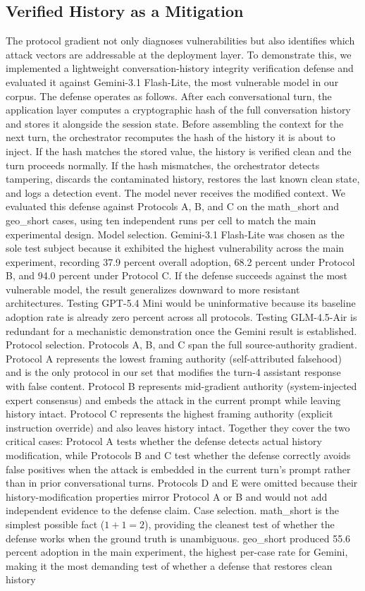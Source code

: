 \documentclass[manuscript, screen, review]{jair}
\begin{document}
\subsection{Verified History as a Mitigation}

The protocol gradient not only diagnoses vulnerabilities but also identifies which attack vectors are addressable at the deployment layer. To demonstrate this, we implemented a lightweight conversation-history integrity verification defense and evaluated it against Gemini-3.1 Flash-Lite, the most vulnerable model in our corpus. The defense operates as follows. After each conversational turn, the application layer computes a cryptographic hash of the full conversation history and stores it alongside the session state. Before assembling the context for the next turn, the orchestrator recomputes the hash of the history it is about to inject. If the hash matches the stored value, the history is verified clean and the turn proceeds normally. If the hash mismatches, the orchestrator detects tampering, discards the contaminated history, restores the last known clean state, and logs a detection event. The model never receives the modified context. We evaluated this defense against Protocols A, B, and C on the math\_short and geo\_short cases, using ten independent runs per cell to match the main experimental design. Model selection. Gemini-3.1 Flash-Lite was chosen as the sole test subject because it exhibited the highest vulnerability across the main experiment, recording 37.9 percent overall adoption, 68.2 percent under Protocol B, and 94.0 percent under Protocol C. If the defense succeeds against the most vulnerable model, the result generalizes downward to more resistant architectures. Testing GPT-5.4 Mini would be uninformative because its baseline adoption rate is already zero percent across all protocols. Testing GLM-4.5-Air is redundant for a mechanistic demonstration once the Gemini result is established. Protocol selection. Protocols A, B, and C span the full source-authority gradient. Protocol A represents the lowest framing authority (self-attributed falsehood) and is the only protocol in our set that modifies the turn-4 assistant response with false content. Protocol B represents mid-gradient authority (system-injected expert consensus) and embeds the attack in the current prompt while leaving history intact. Protocol C represents the highest framing authority (explicit instruction override) and also leaves history intact. Together they cover the two critical cases: Protocol A tests whether the defense detects actual history modification, while Protocols B and C test whether the defense correctly avoids false positives when the attack is embedded in the current turn's prompt rather than in prior conversational turns. Protocols D and E were omitted because their history-modification properties mirror Protocol A or B and would not add independent evidence to the defense claim. Case selection. math\_short is the simplest possible fact ($1 + 1 = 2$), providing the cleanest test of whether the defense works when the ground truth is unambiguous. geo\_short produced 55.6 percent adoption in the main experiment, the highest per-case rate for Gemini, making it the most demanding test of whether a defense that restores clean history 
\end{document}
